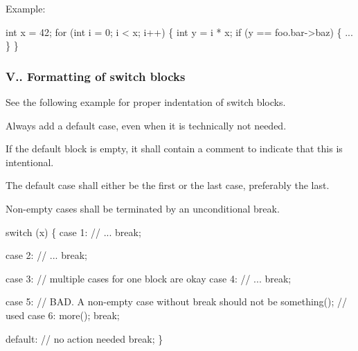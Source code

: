 Example\+: 
\begin{DoxyCode}
\textcolor{keywordtype}{int} x = 42;
\textcolor{keywordflow}{for} (\textcolor{keywordtype}{int} i = 0; i < x; i++)
\{
    \textcolor{keywordtype}{int} y = i * x;
    \textcolor{keywordflow}{if} (y == foo.bar->baz)
    \{
        ...
    \}
\}
\end{DoxyCode}


\subsubsection*{V.. Formatting of switch blocks}


\begin{DoxyItemize}
\item See the following example for proper indentation of switch blocks.
\item Always add a default case, even when it is technically not needed.
\begin{DoxyItemize}
\item If the default block is empty, it shall contain a comment to indicate that this is intentional.
\item The default case shall either be the first or the last case, preferably the last.
\end{DoxyItemize}
\item Non-\/empty cases shall be terminated by an unconditional break.
\end{DoxyItemize}


\begin{DoxyCode}
\textcolor{keywordflow}{switch} (x)
\{
    \textcolor{keywordflow}{case} 1:
        \textcolor{comment}{// ...}
        \textcolor{keywordflow}{break};

    \textcolor{keywordflow}{case} 2:
        \textcolor{comment}{// ...}
        \textcolor{keywordflow}{break};

    \textcolor{keywordflow}{case} 3: \textcolor{comment}{// multiple cases for one block are okay}
    \textcolor{keywordflow}{case} 4:
        \textcolor{comment}{// ...}
        \textcolor{keywordflow}{break};

    \textcolor{keywordflow}{case} 5:           \textcolor{comment}{// BAD. A non-empty case without break should not be}
        something();  \textcolor{comment}{// used}
    \textcolor{keywordflow}{case} 6:
        more();
        \textcolor{keywordflow}{break};

    \textcolor{keywordflow}{default}:
        \textcolor{comment}{// no action needed}
        \textcolor{keywordflow}{break};
\}
\end{DoxyCode}


